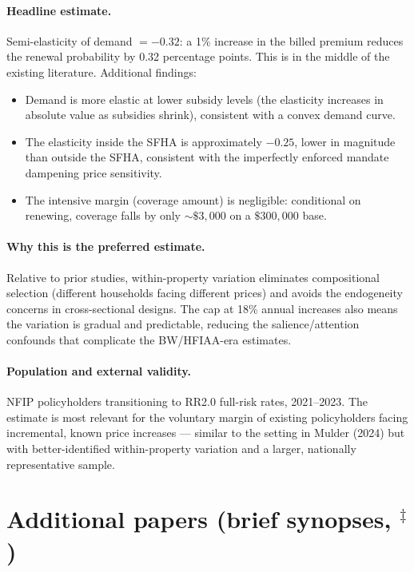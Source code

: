 \documentclass[11pt]{article}
\begin{document}
\paragraph{Headline estimate.}
Semi-elasticity of demand $= -0.32$: a 1\% increase in the billed premium reduces the renewal probability by 0.32 percentage points. This is in the middle of the existing literature. Additional findings:
\begin{itemize}
    \item Demand is more elastic at lower subsidy levels (the elasticity increases in absolute value as subsidies shrink), consistent with a convex demand curve.
    \item The elasticity inside the SFHA is approximately $-0.25$, lower in magnitude than outside the SFHA, consistent with the imperfectly enforced mandate dampening price sensitivity.
    \item The intensive margin (coverage amount) is negligible: conditional on renewing, coverage falls by only $\sim\$3{,}000$ on a $\$300{,}000$ base.
\end{itemize}

\paragraph{Why this is the preferred estimate.}
Relative to prior studies, within-property variation eliminates compositional selection (different households facing different prices) and avoids the endogeneity concerns in cross-sectional designs. The cap at 18\% annual increases also means the variation is gradual and predictable, reducing the salience/attention confounds that complicate the BW/HFIAA-era estimates.

\paragraph{Population and external validity.}
NFIP policyholders transitioning to RR2.0 full-risk rates, 2021--2023. The estimate is most relevant for the voluntary margin of existing policyholders facing incremental, known price increases --- similar to the setting in Mulder (2024) but with better-identified within-property variation and a larger, nationally representative sample.

\section{Additional papers (brief synopses, $^\ddagger$)}
\end{document}
